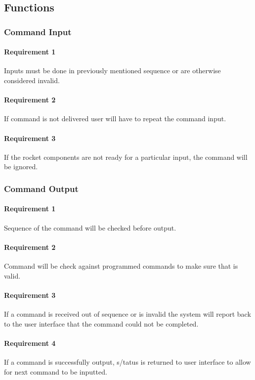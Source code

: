 \documentclass[10pt,draftclsnofoot,onecolumn,retainorgcmds]{IEEEtran}
\begin{document}
\subsection{Functions}
\subsubsection{Command Input}
\paragraph{ Requirement 1}Inputs must be done in previously mentioned sequence or are otherwise considered invalid. \par
\paragraph{ Requirement 2}If command is not delivered user will have to repeat the command input.\par
\paragraph{ Requirement 3}If the rocket components are not ready for a particular input, the command will be ignored. \par
\subsubsection{Command Output}
\paragraph{ Requirement 1}Sequence of the command will be checked before output.\par
\paragraph{ Requirement 2}Command will be check against programmed commands to make sure that is valid.\par
\paragraph{ Requirement 3}If a command is received out of sequence or is invalid the system will report back to the user interface that the command could not be completed.\par
\paragraph{ Requirement 4}If a command is successfully output, s/tatus is returned to user interface to allow for next command to be inputted.\par
\end{document}

